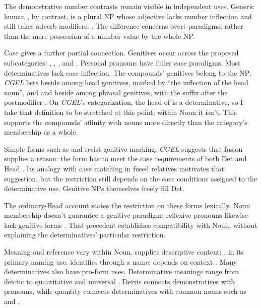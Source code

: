 \documentclass[12pt]{article}
\begin{document}
The demonstrative number contrasts remain visible in independent uses. Generic human , by contrast, is a plural NP whose adjective lacks number inflection and still takes adverb modifiers:  \citep[418]{huddleston2002}. The difference concerns overt paradigms, rather than the mere possession of a number value by the whole NP.

Case gives a further partial connection. Genitives occur across the proposed subcategories: , , , and . Personal pronouns have fuller case paradigms. Most determinatives lack case inflection. The compounds' genitives belong to the NP: \textit{CGEL} lists  beside  among head genitives, marked by \enquote{the inflection of the head noun}, and  and  beside  among phrasal genitives, with the suffix after the postmodifier \citep[479]{huddleston2002}. On \textit{CGEL}'s categorization, the head of  is a determinative, so I take that definition to be stretched at this point; within Noun it isn't. This supports the compounds' affinity with nouns more directly than the category's membership as a whole.

Simple forms such as  and  resist genitive marking. \textit{CGEL} suggests that fusion supplies a reason: the form has to meet the case requirements of both Det and Head \citep[420]{huddleston2002}. Its analogy with case matching in fused relatives \citep[1073--1074]{huddleston2002} motivates that suggestion, but the restriction still depends on the case conditions assigned to the determinative use. Genitive NPs themselves freely fill Det.

The ordinary-Head account states the restriction on these forms lexically. Noun membership doesn't guarantee a genitive paradigm: reflexive pronouns likewise lack genitive forms \citep[426]{huddleston2002}. That precedent establishes compatibility with Noun, without explaining the determinatives' particular restriction.

Meaning and reference vary within Noun.  supplies descriptive content; , in its primary naming use, identifies through a name;  depends on context \citep[425--428, 516--521]{huddleston2002}. Many determinatives also have pro-form uses. Determinative meanings range from deictic  to quantitative  and universal  \citep[358--360, 370--405]{huddleston2002}. Deixis connects demonstratives with pronouns, while quantity connects determinatives with common nouns such as  and .
\end{document}

